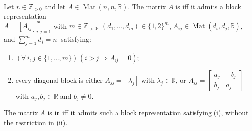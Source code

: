 \begin{illustrationfigure}[H]
  \centering
  
  \caption{A complex eigenpair determines a nonzero invariant real line or plane.}
  \label{fig:real-invariant-plane-from-complex-eigenpair}
\end{illustrationfigure}

\begin{definition} \label{def:almost-upper-triangular-real-matrix} \\
Let $n\in\mathbb{Z}_{>0}$ and let $A\in\operatorname{Mat}(n,n,\mathbb{R})$. The matrix $A$ is  iff it admits a block representation\\
$A=[A_{ij}]_{i,j=1}^{m}$ with $m\in\mathbb{Z}_{>0}$, $(d_1,\ldots,d_m)\in\{1,2\}^m$, $A_{ij}\in\operatorname{Mat}(d_i,d_j,\mathbb{R})$, and $\sum\limits_{j=1}^{m}d_j=n$, satisfying:
\begin{enumerate}[label=(\roman*)]
\setlength{\itemsep}{0pt}
\item $(\forall\,i,j\in\{1,\ldots,m\})\,(i>j\Rightarrow A_{ij}=0)$;
\item every diagonal block is either $A_{jj}=[\lambda_j]$ with $\lambda_j\in\mathbb{R}$, or $A_{jj}=\left[\begin{smallmatrix}a_j&-b_j\\b_j&a_j\end{smallmatrix}\right]$ with $a_j,b_j\in\mathbb{R}$ and $b_j\neq0$.
\end{enumerate}
The matrix $A$ is in  iff it admits such a block representation satisfying (i), without the restriction in (ii).
\end{definition}

